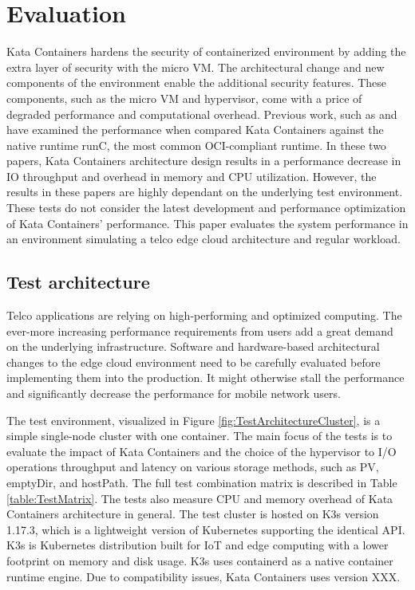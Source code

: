 \chapter{Evaluation}
\label{chapter:evaluation}

Kata Containers hardens the security of containerized environment by adding the extra layer of security with the micro VM. The architectural change and new components of the environment enable the additional security features. These components, such as the micro VM and hypervisor, come with a price of degraded performance and computational overhead. Previous work, such as \cite{EverartsdeVelp2020} and \cite{Kumar2020} have examined the performance when compared Kata Containers against the native runtime runC, the most common OCI-compliant runtime. In these two papers, Kata Containers architecture design results in a performance decrease in IO throughput and overhead in memory and CPU utilization. However, the results in these papers are highly dependant on the underlying test environment. These tests do not consider the latest development and performance optimization of Kata Containers' performance. This paper evaluates the system performance in an environment simulating a telco edge cloud architecture and regular workload.

\section{Test architecture}
\label{section:test_architecture}

Telco applications are relying on high-performing and optimized computing. The ever-more increasing performance requirements from users add a great demand on the underlying infrastructure. Software and hardware-based architectural changes to the edge cloud environment need to be carefully evaluated before implementing them into the production. It might otherwise stall the performance and significantly decrease the performance for mobile network users.

The test environment, visualized in Figure \ref{fig:TestArchitectureCluster}, is a simple single-node cluster with one container. The main focus of the tests is to evaluate the impact of Kata Containers and the choice of the hypervisor to I/O operations throughput and latency on various storage methods, such as PV, emptyDir, and hostPath. The full test combination matrix is described in Table \ref{table:TestMatrix}. The tests also measure CPU and memory overhead of Kata Containers architecture in general. The test cluster is hosted on K3s\cite{K3s} version 1.17.3, which is a lightweight version of Kubernetes supporting the identical API. K3s is Kubernetes distribution built for IoT and edge computing with a lower footprint on memory and disk usage. K3s uses containerd as a native container runtime engine. Due to compatibility issues, Kata Containers uses version XXX.

